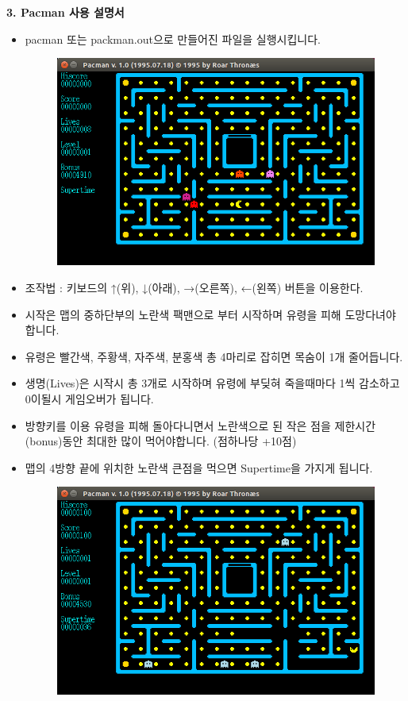 \documentclass{article}
\begin{document}
\newpage
\begin{large}\textbf{3. Pacman 사용 설명서}\end{large}
\begin{itemize}
\item pacman 또는 packman.out으로 만들어진 파일을 실행시킵니다.
\begin{figure}[!h]
\centering
\includegraphics[width=1\columnwidth]{start}
\end{figure}
\item 조작법 : 키보드의 ↑(위), ↓(아래), →(오른쪽), ←(왼쪽) 버튼을 이용한다.
\item 시작은 맵의 중하단부의 노란색 팩맨으로 부터 시작하며 유령을 피해 도망다녀야 합니다.
\item 유령은 빨간색, 주황색, 자주색, 분홍색 총 4마리로 잡히면 목숨이 1개 줄어듭니다.
\item 생명(Lives)은 시작시 총 3개로 시작하며 유령에 부딪혀 죽을때마다 1씩 감소하고 0이될시 게임오버가 됩니다.
\item 방향키를 이용 유령을 피해 돌아다니면서 노란색으로 된 작은 점을 제한시간(bonus)동안 최대한 많이 먹어야합니다. (점하나당 +10점)
\item 맵의 4방향 끝에 위치한 노란색 큰점을 먹으면 Supertime을 가지게 됩니다.
\newpage

\begin{figure}[!h]
\centering
\includegraphics[width=1\columnwidth]{supertime}
\end{figure}


\end{itemize}
\end{document}
